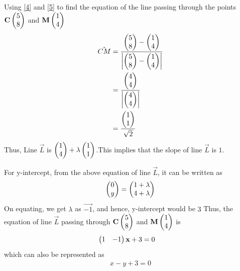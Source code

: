 \documentclass[journal,12pt,twocolumn]{IEEEtran}
\begin{document}
Using \eqref{4} and \eqref{5} to find the equation of the line passing through the points $\mathbf{C}\begin{pmatrix}5\\8\end{pmatrix}$ and $\mathbf{M}\begin{pmatrix}1\\4\end{pmatrix}$
\begin{align}
  \hat{CM} &= \frac{\begin{pmatrix}5\\8\end{pmatrix} - \begin{pmatrix}1\\4\end{pmatrix}}{\begin{vmatrix}\begin{pmatrix}5\\8\end{pmatrix} - \begin{pmatrix}1\\4\end{pmatrix}\end{vmatrix}}\\
   &= \frac{\begin{pmatrix}4\\4\end{pmatrix}}{\begin{vmatrix}\begin{pmatrix}4\\4\end{pmatrix}\end{vmatrix}}\\
   &= \frac{\begin{pmatrix}1\\1\end{pmatrix}}{\sqrt{2}}
\end{align}
Thus, Line $\vec{L}$ is $\begin{pmatrix}1\\4\end{pmatrix} + \lambda\begin{pmatrix}1\\1\end{pmatrix}$.This implies that the slope of line $\vec{L}$ is $1$.

 For y-intercept, from the above equation of line $\vec{L}$, it can be written as
 \begin{align}
     \begin{pmatrix}0\\y\end{pmatrix} = \begin{pmatrix}1+\lambda\\4+\lambda\end{pmatrix} 
 \end{align}
 On equating, we get $\lambda$ as $\vec{-1}$, and hence, y-intercept would be $3$
 \newpage
Thus, the equation of line $\vec{L}$ passing through  $\mathbf{C}\begin{pmatrix}5\\8\end{pmatrix}$ and $\mathbf{M}\begin{pmatrix}1\\4\end{pmatrix}$ is 
\begin{align}
    \begin{pmatrix}1 & - 1\end{pmatrix}\mathbf{x} + 3 &= 0
\end{align}
 which can also be represented as 
 \begin{align}
     x-y+3=0
 \end{align}
\end{document}
